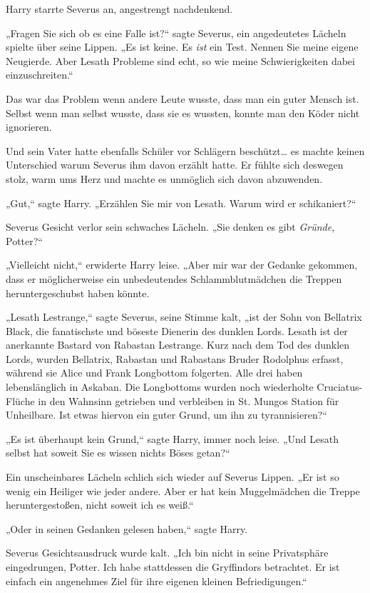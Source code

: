 {Harry starrte Severus an, angestrengt nachdenkend.

„Fragen Sie sich ob es eine Falle ist?“ sagte Severus, ein angedeutetes Lächeln spielte über seine Lippen. „Es ist keine. Es \emph{ist} ein Test. Nennen Sie meine eigene Neugierde. Aber Lesath Probleme sind echt, so wie meine Schwierigkeiten dabei einzuschreiten.“

Das war das Problem wenn andere Leute wusste, dass man ein guter Mensch ist. Selbst wenn man selbst wusste, dass sie es wussten, konnte man den Köder nicht ignorieren.

Und sein Vater hatte ebenfalls Schüler vor Schlägern beschützt… es machte keinen Unterschied warum Severus ihm davon erzählt hatte. Er fühlte sich deswegen stolz, warm ums Herz und machte es unmöglich sich davon abzuwenden.

„Gut,“ sagte Harry. „Erzählen Sie mir von Lesath. Warum wird er schikaniert?“

Severus Gesicht verlor sein schwaches Lächeln. „Sie denken es gibt \emph{Gründe}, Potter?“

„Vielleicht nicht,“ erwiderte Harry leise. „Aber mir war der Gedanke gekommen, dass er möglicherweise ein unbedeutendes Schlammblutmädchen die Treppen heruntergeschubst haben könnte.

„Lesath Lestrange,“ sagte Severus, seine Stimme kalt, „ist der Sohn von Bellatrix Black, die fanatischste und böseste Dienerin des dunklen Lords. Lesath ist der anerkannte Bastard von Rabastan Lestrange. Kurz nach dem Tod des dunklen Lords, wurden Bellatrix, Rabastan und Rabastans Bruder Rodolphus erfasst, während sie Alice und Frank Longbottom folgerten. Alle drei haben lebenslänglich in Askaban. Die Longbottoms wurden noch wiederholte Cruciatus-Flüche in den Wahnsinn getrieben und verbleiben in St. Mungos Station für Unheilbare. Ist etwas hiervon ein guter Grund, um ihn zu tyrannisieren?“

„Es ist überhaupt kein Grund,“ sagte Harry, immer noch leise. „Und Lesath selbst hat soweit Sie es wissen nichts Böses getan?“

Ein unscheinbares Lächeln schlich sich wieder auf Severus Lippen. „Er ist so wenig ein Heiliger wie jeder andere. Aber er hat kein Muggelmädchen die Treppe heruntergestoßen, nicht soweit ich es weiß.“

„Oder in seinen Gedanken gelesen haben,“ sagte Harry.

Severus Gesichtsausdruck wurde kalt. „Ich bin nicht in seine Privatsphäre eingedrungen, Potter. Ich habe stattdessen die Gryffindors betrachtet. Er ist einfach ein angenehmes Ziel für ihre eigenen kleinen Befriedigungen.“

}
